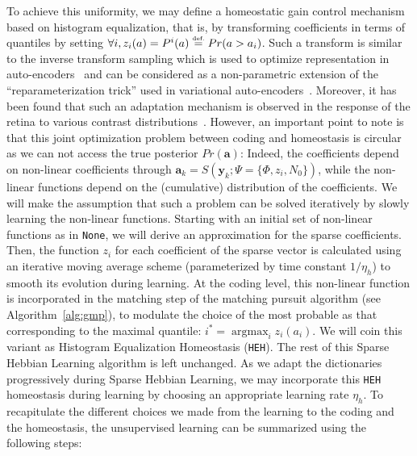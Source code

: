\documentclass[vision,article,submit,oneauthor,pdftex]{Definitions/mdpi}
\DeclareMathOperator*{\ArgMax}{\arg\max}   %
\newcommand{\coef}{\mathbf{a}} %
\newcommand{\image}{\mathbf{y}} %
\newcommand{\dico}{\Phi} %
\newcommand{\eqdef}{\ensuremath{\stackrel{\mbox{\upshape\tiny def.}}{=}}}
\begin{document}
To achieve this uniformity, we may define a homeostatic gain control mechanism based on histogram equalization, that is, by transforming coefficients in terms of quantiles by setting $\forall i, z_i( a ) = P^i(a) \eqdef Pr( a > a_i)$. Such a transform is similar to the inverse transform sampling which is used to optimize representation in auto-encoders~\citep{Doersch2016} and can be considered as a non-parametric extension of the ``reparameterization trick'' used in variational auto-encoders~\citep{Kingma13}. %
Moreover, it has been found that such an adaptation mechanism is observed in the response of the retina to various contrast distributions~\citep{Laughlin81}. However, an important point to note is that this joint optimization problem between coding and homeostasis is circular as we can not access the true posterior $Pr(\coef)$: Indeed, the coefficients depend on non-linear coefficients through $\coef_{k} = S(\image_k; \Psi=\{\dico, z_i, N_0\})$, while the non-linear functions depend on the (cumulative) distribution of the coefficients. We will make the assumption that such a problem can be solved iteratively by slowly learning the non-linear functions. Starting with an initial set of non-linear functions as in \texttt{None}, we will derive an approximation for the sparse coefficients. Then, the function $z_i$ for each coefficient of the sparse vector is calculated using an iterative moving average scheme (parameterized by time constant $1/\eta_h$) to smooth its evolution during learning. At the coding level, this non-linear function is incorporated in the matching step of the matching pursuit algorithm (see Algorithm~\ref{alg:gmp}), to modulate the choice of the most probable as that corresponding to the maximal quantile: $i^\ast = \ArgMax_i z_i(a_i)$. We will coin this variant as Histogram Equalization Homeostasis (\texttt{HEH}). The rest of this Sparse Hebbian Learning algorithm is left unchanged. As we adapt the dictionaries progressively during Sparse Hebbian Learning, we may incorporate this \texttt{HEH} homeostasis during learning by choosing an appropriate learning rate $\eta_h$.
To recapitulate the different choices we made from the learning to the coding and the homeostasis, the unsupervised learning can be summarized using the following steps:
\end{document}
